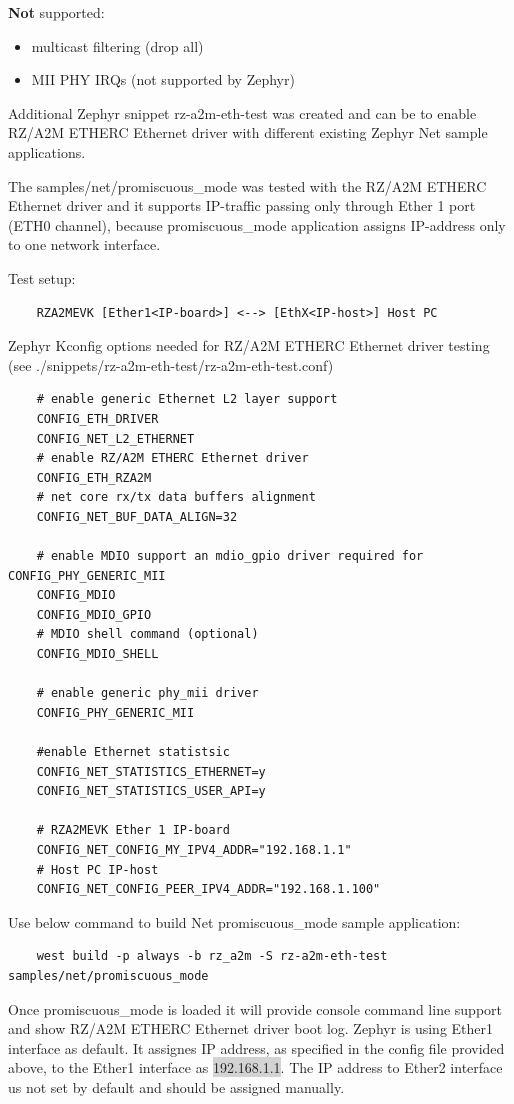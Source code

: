 \documentclass[11pt,a4paper,oneside]{article}
\begin{document}
\textbf{Not} supported:
\begin{itemize}
	\item  multicast filtering (drop all)
	\item  MII PHY IRQs (not supported by Zephyr)
\end{itemize}

Additional Zephyr snippet rz-a2m-eth-test was created and can be to enable RZ/A2M ETHERC Ethernet driver with different existing Zephyr Net sample applications.

The samples/net/promiscuous\_mode was tested with the RZ/A2M ETHERC Ethernet driver and it supports IP-traffic passing only through Ether 1 port (ETH0 channel), because promiscuous\_mode application assigns IP-address only to one network interface.

Test setup:
\begin{lstlisting}
	RZA2MEVK [Ether1<IP-board>] <--> [EthX<IP-host>] Host PC
\end{lstlisting}

Zephyr Kconfig options needed for RZ/A2M ETHERC Ethernet driver testing (see ./snippets/rz-a2m-eth-test/rz-a2m-eth-test.conf)

\begin{lstlisting}
	# enable generic Ethernet L2 layer support
	CONFIG_ETH_DRIVER
	CONFIG_NET_L2_ETHERNET
	# enable RZ/A2M ETHERC Ethernet driver
	CONFIG_ETH_RZA2M
	# net core rx/tx data buffers alignment
	CONFIG_NET_BUF_DATA_ALIGN=32

	# enable MDIO support an mdio_gpio driver required for CONFIG_PHY_GENERIC_MII
	CONFIG_MDIO
	CONFIG_MDIO_GPIO
	# MDIO shell command (optional)
	CONFIG_MDIO_SHELL

	# enable generic phy_mii driver
	CONFIG_PHY_GENERIC_MII

	#enable Ethernet statistsic
	CONFIG_NET_STATISTICS_ETHERNET=y
	CONFIG_NET_STATISTICS_USER_API=y

	# RZA2MEVK Ether 1 IP-board
	CONFIG_NET_CONFIG_MY_IPV4_ADDR="192.168.1.1"
	# Host PC IP-host
	CONFIG_NET_CONFIG_PEER_IPV4_ADDR="192.168.1.100"
\end{lstlisting}

Use below command to build Net promiscuous\_mode sample application:

\begin{lstlisting}
	west build -p always -b rz_a2m -S rz-a2m-eth-test samples/net/promiscuous_mode
\end{lstlisting}

Once promiscuous\_mode is loaded it will provide console command line support and show  RZ/A2M ETHERC Ethernet driver boot log.
Zephyr is using Ether1 interface as default. It assignes IP address, as specified in the config file provided above, to the Ether1 interface as \colorbox{lightgray}{192.168.1.1}.
The IP address to Ether2 interface us not set by default and should be assigned manually.
\end{document}
